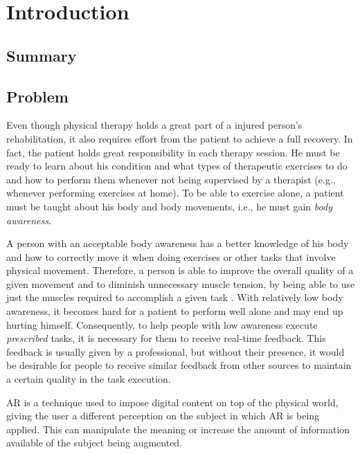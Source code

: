 \chapter{Introduction}
\label{sec:intro}

\section*{Summary}

\section{Problem}


Even though physical therapy holds a great part of a injured person's rehabilitation, 
it also requires effort from the patient to achieve a full recovery.
In fact, the patient holds great responsibility in each therapy session.
He must be ready to learn about his condition and what types of therapeutic exercises 
to do and how to perform them whenever not being supervised by a therapist (e.g., whenever performing exercises at home).
To be able to exercise alone, a patient must be taught about his body and body 
movements, i.e., he must gain \emph{body awareness}.

A person with an acceptable body awareness has a better knowledge of his body and how to correctly move it when doing exercises or other tasks that involve physical movement.
Therefore, a person is able to improve the overall quality of a given movement and to diminish unnecessary muscle tension, 
by being able to use just the muscles required to accomplish a given task \cite{Singh2014a}.
With relatively low body awareness, it becomes hard for a patient to perform well alone and may 
end up hurting himself. %
Consequently, to help people with low awareness 
execute \textit{prescribed} tasks, it is necessary for them to receive real-time feedback.
This feedback is usually given by a professional, 
but without their presence, it would be desirable for people to receive similar feedback from other sources to maintain a certain quality in the task execution.

\ac{AR} is a technique used to impose digital content on top of the physical world,
giving the user a different perception on the subject in which \ac{AR} is being
applied. This can manipulate the meaning or increase the amount of information available
of the subject being augmented.

